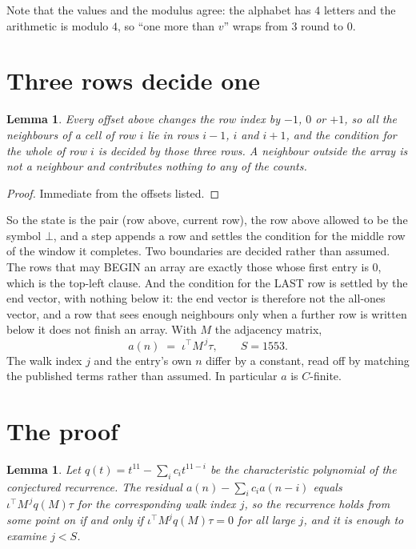 \documentclass[11pt,a4paper]{article}
\theoremstyle{plain}
\newtheorem{lemma}[theorem]{Lemma}
\theoremstyle{definition}
\begin{document}
Note that the values and the modulus agree: the alphabet has $4$ letters and the arithmetic
is modulo $4$, so ``one more than $v$'' wraps from $3$ round to $0$.

\section{Three rows decide one}

\begin{lemma}\label{lem:win}
Every offset above changes the row index by $-1$, $0$ or $+1$, so all the neighbours of a cell
of row $i$ lie in rows $i-1$, $i$ and $i+1$, and the condition for the whole of row $i$ is
decided by those three rows. A neighbour outside the array is not a neighbour and contributes
nothing to any of the counts.
\end{lemma}

\begin{proof}
Immediate from the offsets listed.
\end{proof}

So the state is the pair (row above, current row), the row above allowed to be the symbol
$\bot$, and a step appends a row and settles the condition for the middle row of the window it
completes. Two boundaries are decided rather than assumed. The rows that may BEGIN an array are
exactly those whose first entry is $0$, which is the top-left clause. And the condition for the
LAST row is settled by the end vector, with nothing below it: the end vector is therefore not
the all-ones vector, and a row that sees enough neighbours only when a further row is written
below it does not finish an array. With $M$ the adjacency matrix,
\[
a(n)\;=\;\iota^{\!\top}M^{\,j}\tau ,\qquad S=1553.
\]
The walk index $j$ and the entry's own $n$ differ by a constant, read off by matching the
published terms rather than assumed. In particular $a$ is $C$-finite.

\section{The proof}

\begin{lemma}\label{lem:crit}
Let $q(t)=t^{11}-\sum_i c_it^{11-i}$ be the characteristic polynomial of the
conjectured recurrence. The residual $a(n)-\sum_ic_ia(n-i)$ equals
$\iota^{\!\top}M^{\,j}q(M)\tau$ for the corresponding walk index $j$, so the recurrence
holds from some point on if and only if $\iota^{\!\top}M^{j}q(M)\tau=0$ for all large $j$,
and it is enough to examine $j<S$.
\end{lemma}
\end{document}
